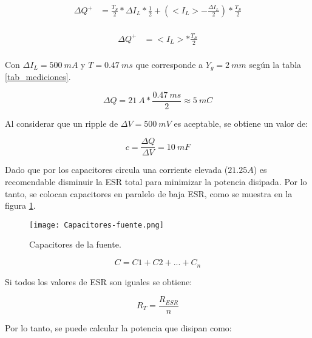 \begin{equation} 
	\begin{aligned}
		\Delta Q ^+ &= \frac{T_S}{2}*\Delta I_L * \frac{1}{2} + (<I_L> -\frac{\Delta I_L}{2})*\frac{T_S}{2}\\
	\end{aligned}
\end{equation}

\begin{equation} 
	\begin{aligned}
		\Delta Q ^+ &= <I_L> *\frac{T_S}{2}\\
	\end{aligned}
\end{equation}

\noindent Con $\Delta I_L=500 \:mA$ y $T=0.47\:ms$ que corresponde a $Y_g = 2 \:mm$ según la tabla \ref{tab_mediciones}.

\begin{equation} 
	\Delta Q = 21\:A * \frac{0.47\:ms}{2} \approx 5\:mC
\end{equation}

\noindent Al considerar que un ripple de $\Delta V=500 \:mV$ es aceptable, se obtiene un valor de:

\begin{equation} 
	c = \frac{\Delta Q}{\Delta V} = 10 \:mF
\end{equation}

\noindent Dado que por los capacitores circula una corriente elevada ($21.25 A$) es recomendable disminuir la ESR total para minimizar la potencia disipada. Por lo tanto, se colocan capacitores en paralelo de baja ESR, como se muestra en la figura \ref{fig:img_capacitores-fuente}.

\begin{figure}[H]
	\centering
	\texttt{[image: Capacitores-fuente.png]}
	\caption{Capacitores de la fuente.}
	\label{fig:img_capacitores-fuente}
\end{figure}


\begin{equation} 
	C = C1 + C2 + ... + C_n
\end{equation}


\noindent Si todos los valores de ESR son iguales se obtiene:

\begin{equation} 
	R_T = \frac{R_{ESR}}{n}
\end{equation}

\noindent Por lo tanto, se puede calcular la potencia que disipan como:

